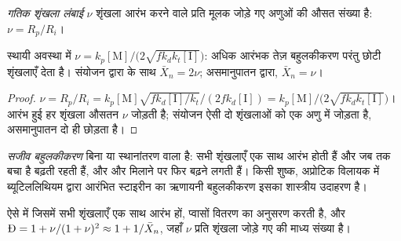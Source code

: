 \begin{definition}[गतिक शृंखला लंबाई]\label{def:b2:polymer-synthesis:chain-length}
\emph{गतिक शृंखला लंबाई} $\nu$ शृंखला आरंभ करने वाले प्रति मूलक जोड़े गए 
अणुओं की औसत संख्या है: $\nu = R_p/R_i$।
\end{definition}

\begin{proposition}[शृंखला लंबाई और आरंभक]\label{prop:b2:polymer-synthesis:chain-length}
स्थायी अवस्था में $\nu = k_p[\mathrm M]/\bigl(2\sqrt{fk_dk_t[\mathrm I]}\bigr)$: अधिक आरंभक
तेज़ बहुलकीकरण परंतु छोटी शृंखलाएँ देता है। संयोजन द्वारा  के साथ $\bar X_n = 2\nu$;
असमानुपातन द्वारा, $\bar X_n = \nu$।
\end{proposition}

\begin{proof}
$\nu = R_p/R_i = k_p[\mathrm M]\sqrt{fk_d[\mathrm I]/k_t}/(2fk_d[\mathrm I]) =
k_p[\mathrm M]/\bigl(2\sqrt{fk_dk_t[\mathrm I]}\bigr)$। आरंभ हुई हर शृंखला औसतन $\nu$  जोड़ती है;
संयोजन ऐसी दो शृंखलाओं को एक अणु में जोड़ता है, असमानुपातन दो ही छोड़ता है।
\end{proof}

\begin{definition}[सजीव बहुलकीकरण]\label{def:b2:polymer-synthesis:living}
\emph{सजीव बहुलकीकरण} बिना  या
स्थानांतरण वाला  है: सभी शृंखलाएँ एक साथ आरंभ होती हैं और जब तक  बचा है बढ़ती रहती हैं, और
और  मिलाने पर फिर बढ़ने लगती हैं। किसी शुष्क, अप्रोटिक विलायक में ब्यूटिललिथियम द्वारा आरंभित
स्टाइरीन का ऋणायनी बहुलकीकरण इसका शास्त्रीय उदाहरण है।
\end{definition}

\begin{proposition}[संकीर्ण वितरण]\label{prop:b2:polymer-synthesis:living}
ऐसे  में जिसमें सभी शृंखलाएँ एक साथ आरंभ हों, 
प्वासों वितरण का अनुसरण करती है, और $\text{\DH} = 1 + \nu/(1+\nu)^2 \approx 1 + 1/\bar X_n$, जहाँ $\nu$
प्रति शृंखला जोड़े गए  की माध्य संख्या है।
\end{proposition}

